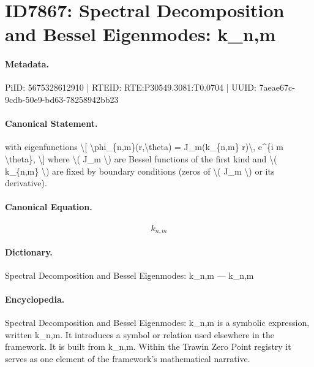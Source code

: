 \section*{ID7867: Spectral Decomposition and Bessel Eigenmodes: k\_n,m}
\paragraph{Metadata.}
PiID: 5675328612910 | RTEID: RTE:P30549.3081:T0.0704 | UUID: 7aeae67c-9cdb-50e9-bd63-78258942bb23

\paragraph{Canonical Statement.}
with eigenfunctions \textbackslash{}[ \textbackslash{}phi\_\{n,m\}(r,\textbackslash{}theta) = J\_m(k\_\{n,m\} r)\textbackslash{}, e\textasciicircum{}\{i m \textbackslash{}theta\}, \textbackslash{}] where \textbackslash{}( J\_m \textbackslash{}) are Bessel functions of the first kind and \textbackslash{}( k\_\{n,m\} \textbackslash{}) are fixed by boundary conditions (zeros of \textbackslash{}( J\_m \textbackslash{}) or its derivative).

\paragraph{Canonical Equation.}
\[
k_{n,m}
\]

\paragraph{Dictionary.}
Spectral Decomposition and Bessel Eigenmodes: k\_n,m — k\_n,m

\paragraph{Encyclopedia.}
Spectral Decomposition and Bessel Eigenmodes: k\_n,m is a symbolic expression, written k\_n,m. It introduces a symbol or relation used elsewhere in the framework. It is built from k\_n,m. Within the Trawin Zero Point registry it serves as one element of the framework's mathematical narrative.
